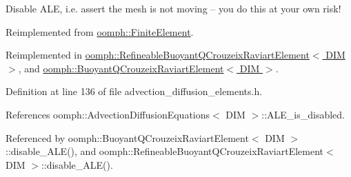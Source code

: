 Disable A\+LE, i.\+e. assert the mesh is not moving -- you do this at your own risk! 



Reimplemented from \hyperlink{classoomph_1_1FiniteElement_a625ea6d3f9baccfbdd1323315fb3ec71}{oomph\+::\+Finite\+Element}.



Reimplemented in \hyperlink{classoomph_1_1RefineableBuoyantQCrouzeixRaviartElement_a7fdb84a7d69740668514e0dae2d07f7e}{oomph\+::\+Refineable\+Buoyant\+Q\+Crouzeix\+Raviart\+Element$<$ D\+I\+M $>$}, and \hyperlink{classoomph_1_1BuoyantQCrouzeixRaviartElement_a534fc134280b7447eecc4cad46b2e4c5}{oomph\+::\+Buoyant\+Q\+Crouzeix\+Raviart\+Element$<$ D\+I\+M $>$}.



Definition at line 136 of file advection\+\_\+diffusion\+\_\+elements.\+h.



References oomph\+::\+Advection\+Diffusion\+Equations$<$ D\+I\+M $>$\+::\+A\+L\+E\+\_\+is\+\_\+disabled.



Referenced by oomph\+::\+Buoyant\+Q\+Crouzeix\+Raviart\+Element$<$ D\+I\+M $>$\+::disable\+\_\+\+A\+L\+E(), and oomph\+::\+Refineable\+Buoyant\+Q\+Crouzeix\+Raviart\+Element$<$ D\+I\+M $>$\+::disable\+\_\+\+A\+L\+E().

\mbox{\label{classoomph_1_1AdvectionDiffusionEquations_ac3c3b0bec7f34f53eb330cd777dcbe59}} 
